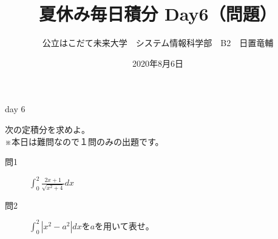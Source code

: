\documentclass[dvipdfmx,uplatex]{jsarticle}
\title{夏休み毎日積分 Day6（問題）}
\author{公立はこだて未来大学　システム情報科学部　B2　日置竜輔}
\date{2020年8月6日}
\begin{document}
\maketitle

\begin{itembox}[c]{day 6}
    \begin{center}
        次の定積分を求めよ。\\
        ※本日は難問なので１問のみの出題です。
    \end{center}
\end{itembox}

\begin{description}
    \item [問1] $ \displaystyle \int_0^2 \frac{2x + 1}{\sqrt{x^2 + 4}} dx $
\end{description}

\begin{description}
    \item [問2] $ \displaystyle \int_0^2 \left|x^2 - a^2\right| dx $を$a$を用いて表せ。\\
\end{description}
\end{document}
